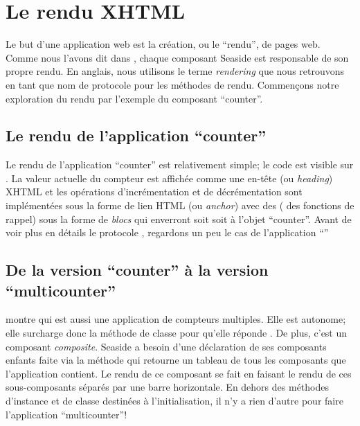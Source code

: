 \documentclass[a4paper,10pt,twoside]{book}
\begin{document}
\section{Le rendu XHTML}

Le but d'une application web est la création, ou le ``rendu'', de pages web.
Comme nous l'avons dit dans , chaque composant
Seaside est responsable de son propre rendu.
En anglais, nous utilisons le terme \emph{rendering} que nous
retrouvons en tant que nom de protocole pour les méthodes de rendu.
Commençons notre exploration du rendu par l'exemple du composant ``counter''.

\subsection{Le rendu de l'application ``counter''}

Le rendu de l'application ``counter'' est relativement simple; le code
est visible sur .
La valeur actuelle du compteur est affichée comme une en-tête (ou
\emph{heading}) XHTML et les opérations d'incrémentation et de
décrémentation sont implémentées sous la forme de lien HTML (ou
\emph{anchor}) avec des \callbacks (\ie{} des fonctions
de rappel) sous la forme de \emph{blocs} qui enverront soit
 soit  à l'objet ``counter''.
Avant de voir plus en détails le protocole , regardons
un peu le cas de l'application ``''

\subsection{De la version ``counter'' à la version ``multicounter''}

 montre  qui est
aussi une application
de compteurs multiples. Elle est autonome; elle surcharge donc la méthode de
classe  pour qu'elle réponde
.
De plus, c'est un composant \emph{composite}. Seaside a besoin d'une
déclaration de ses composants enfants faite via la méthode
 qui retourne un tableau de tous les composants que
l'application contient.
Le rendu de ce composant se fait en faisant le rendu de ces
sous-composants séparés par une barre horizontale.
En dehors des méthodes d'instance et de classe destinées à
l'initialisation, il n'y a rien d'autre pour faire l'application
``multicounter''!
\end{document}

